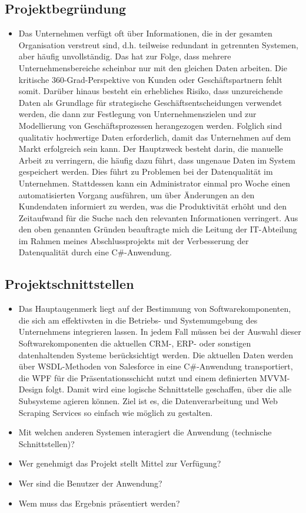 \subsection{Projektbegründung} 
\label{sec:Projektbegruendung}
\begin{itemize}
	\item Das Unternehmen verfügt oft über Informationen, die in der gesamten Organisation verstreut sind, d.h. teilweise redundant in getrennten Systemen, aber häufig unvollständig.
	Das hat zur Folge, dass mehrere Unternehmensbereiche scheinbar nur mit den gleichen Daten arbeiten. 
	Die kritische 360-Grad-Perspektive von Kunden oder Geschäftspartnern fehlt somit. 
	Darüber hinaus besteht ein erhebliches Risiko, dass unzureichende Daten als Grundlage für strategische Geschäftsentscheidungen verwendet werden, die dann zur Festlegung von Unternehmenszielen und zur Modellierung von Geschäftsprozessen herangezogen werden. 
	Folglich sind qualitativ hochwertige Daten erforderlich, damit das Unternehmen auf dem Markt erfolgreich sein kann. Der Hauptzweck besteht darin, die manuelle Arbeit zu verringern, die häufig dazu führt, dass ungenaue Daten im System gespeichert werden. 
    Dies führt zu Problemen bei der Datenqualität im Unternehmen. 
	Stattdessen kann ein Administrator einmal pro Woche einen automatisierten Vorgang ausführen, um über Änderungen an den Kundendaten informiert zu werden, was die Produktivität erhöht und den Zeitaufwand für die Suche nach den relevanten Informationen verringert.
	Aus den oben genannten Gründen beauftragte mich die Leitung der IT-Abteilung im Rahmen meines Abschlussprojekts mit der Verbesserung der Datenqualität durch eine C\#-Anwendung.
\end{itemize}

\subsection{Projektschnittstellen} 
\label{sec:Projektschnittstellen}
\begin{itemize}
	\item Das Hauptaugenmerk liegt auf der Bestimmung von Softwarekomponenten, die sich am effektivsten in die Betriebs- und Systemumgebung des Unternehmens integrieren lassen.
	In jedem Fall müssen bei der Auswahl dieser Softwarekomponenten die aktuellen CRM-, ERP- oder sonstigen datenhaltenden Systeme berücksichtigt werden. 
	Die aktuellen Daten werden über WSDL-Methoden von Salesforce in eine C#-Anwendung transportiert, die WPF für die Präsentationsschicht nutzt und einem definierten MVVM-Design folgt. 
	Damit wird eine logische Schnittstelle geschaffen, über die alle Subsysteme agieren können. Ziel ist es, die Datenverarbeitung und Web Scraping Services so einfach wie möglich zu gestalten.

	\item Mit welchen anderen Systemen interagiert die Anwendung (technische Schnittstellen)?
	\item Wer genehmigt das Projekt \bzw stellt Mittel zur Verfügung? 
	\item Wer sind die Benutzer der Anwendung?
	\item Wem muss das Ergebnis präsentiert werden?
\end{itemize}


